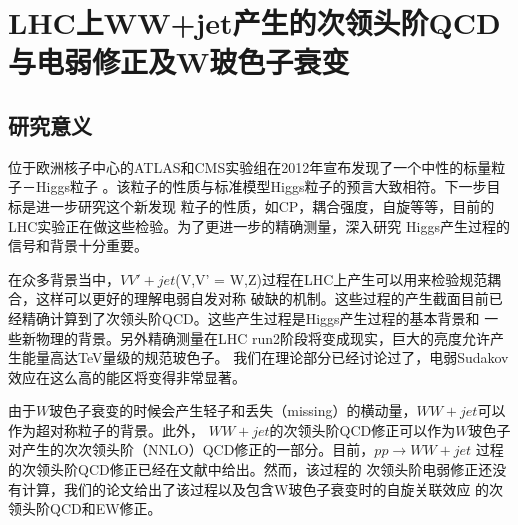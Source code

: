 ﻿
\chapter{LHC上WW+jet产生的次领头阶QCD与电弱修正及W玻色子衰变}
\label{chap:wwjet}

\section{研究意义}
位于欧洲核子中心的ATLAS和CMS实验组在2012年宣布发现了一个中性的标量粒子－Higgs粒子
\cite{ATLAS-2012,CMS-2012}。该粒子的性质与标准模型Higgs粒子的预言大致相符。下一步目标是进一步研究这个新发现
粒子的性质，如CP，耦合强度，自旋等等，目前的LHC实验正在做这些检验。为了更进一步的精确测量，深入研究
Higgs产生过程的信号和背景十分重要。

在众多背景当中，$VV'+jet$(V,V' = W,Z)过程在LHC上产生可以用来检验规范耦合，这样可以更好的理解电弱自发对称
破缺的机制。这些过程的产生截面目前已经精确计算到了次领头阶QCD。这些产生过程是Higgs产生过程的基本背景和
一些新物理的背景。另外精确测量在LHC run2阶段将变成现实，巨大的亮度允许产生能量高达TeV量级的规范玻色子。
我们在理论部分已经讨论过了，电弱Sudakov效应在这么高的能区将变得非常显著。

由于$W$玻色子衰变的时候会产生轻子和丢失（missing）的横动量，$WW+jet$可以作为超对称粒子的背景。此外，
$WW+jet$的次领头阶QCD修正可以作为$W$玻色子对产生的次次领头阶（NNLO）QCD修正的一部分。目前，$pp\to WW+jet$
过程的次领头阶QCD修正已经在文献中\cite{Cambell:pp2WWjet,Ditt:pp2WWjet,Ditt:prl}给出。然而，该过程的
次领头阶电弱修正还没有计算，我们的论文\cite{Li:wwjetEW}给出了该过程以及包含W玻色子衰变时的自旋关联效应
的次领头阶QCD和EW修正。


